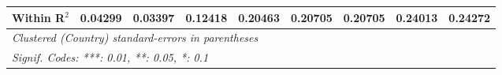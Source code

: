 \begin{table}[htbp]
\begin{tabular}{lcccccccc}
      Within R$^2$                                                       & 0.04299       & 0.03397  & 0.12418  & 0.20463        & 0.20705        & 0.20705                & 0.24013       & 0.24272\\  
      \midrule \midrule
      \multicolumn{9}{l}{\emph{Clustered (Country) standard-errors in parentheses}}\\
      \multicolumn{9}{l}{\emph{Signif. Codes: ***: 0.01, **: 0.05, *: 0.1}}\\
   \end{tabular}
\end{table}


